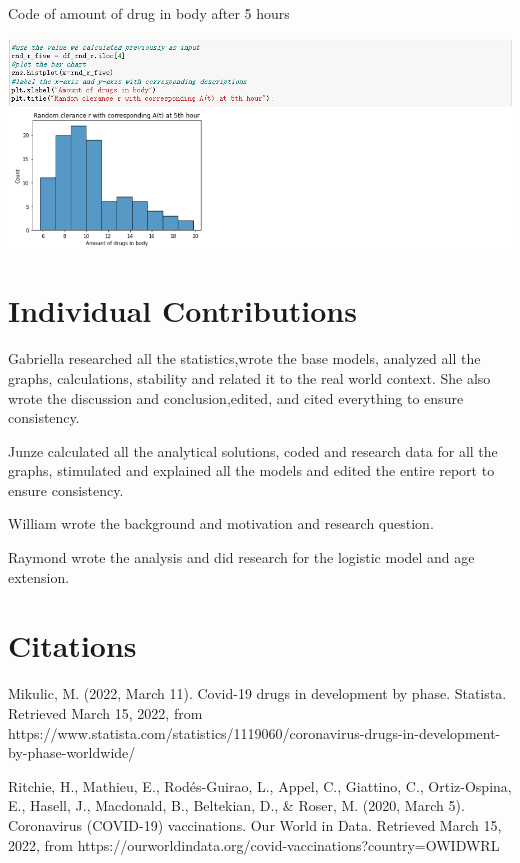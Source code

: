 \documentclass{article}
\begin{document}
Code of amount of drug in body after 5 hours\\
\begin{center}
    \includegraphics[scale = 0.6]{CodeOfdistribution_of_A(t).png}
\end{center}
\section*{Individual Contributions }

Gabriella researched all the statistics,wrote the base models, analyzed all the graphs, calculations, stability and related it to the real world context. She also wrote the discussion and conclusion,edited, and cited everything to ensure consistency. 

Junze calculated all the analytical solutions, coded and research data for all the graphs, stimulated and explained all the models and edited the entire report to ensure consistency. 

William wrote the background and motivation and research question. 

Raymond wrote the analysis and did research for the logistic model and age extension. 



\section*{Citations}

Mikulic, M. (2022, March 11). Covid-19 drugs in development by phase. Statista. Retrieved March 15, 2022, from https://www.statista.com/statistics/1119060/coronavirus-drugs-in-development-by-phase-worldwide/

Ritchie, H., Mathieu, E., Rodés-Guirao, L., Appel, C., Giattino, C., Ortiz-Ospina, E., Hasell, J., Macdonald, B., Beltekian, D., & Roser, M. (2020, March 5). Coronavirus (COVID-19) vaccinations. Our World in Data. Retrieved March 15, 2022, from https://ourworldindata.org/covid-vaccinations?country=OWIDWRL 
\end{document}
